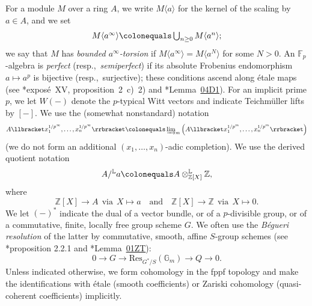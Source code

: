 \documentclass[11pt, reqno]{amsart}
\newcommand{\bF}{\mathbb{F}}
\newcommand{\bL}{\mathbb{L}}
\newcommand{\bZ}{\mathbb{Z}}
\newcommand{\ce}{\colonequals}
\newcommand{\llb}{\llbracket}			%
\providecommand{\p}[1]{\left(#1\right)}
\newcommand{\ra}{\rightarrow}
\newcommand{\rrb}{\rrbracket}			%
\newcommand{\lab}{\label}
\newcommand{\x}{\text}
\providecommand{\qxq}[1]{\quad\text{#1}\quad}
\newcommand{\tst}{\textstyle}
\newcommand{\be}{\begin{equation}}
\newcommand{\ee}{\end{equation}}
\numberwithin{equation}{numberingbase}
\theoremstyle{thms}
\theoremstyle{claims}
\theoremstyle{defs}
\theoremstyle{thms}
\theoremstyle{defs}
\theoremstyle{subsection-tweak}
\theoremstyle{subsection-tweak}
\begin{document}
For a module $M$ over a ring $A$, we write $M\langle a \rangle$ for the kernel of the scaling by $a \in A$, and we set 
\[
\tst M\langle a^\infty \rangle \ce \bigcup_{n \ge 0} M\langle a^n\rangle;
\]
we say that $M$ has \emph{bounded $a^\infty$-torsion} if $M\langle a^\infty\rangle = M\langle a^N\rangle $ for some  $N > 0$. %
An $\bF_p$-algebra is \emph{perfect} (resp.,~\emph{semiperfect}) if its absolute Frobenius endomorphism $a \mapsto a^p$ is bijective (resp.,~surjective); these conditions ascend along \'{e}tale maps (see \cite{SGA5}*{expos\'{e}~XV, proposition~2~c)~2)} and \cite{SP}*{Lemma~\href{https://stacks.math.columbia.edu/tag/04D1}{04D1}}). For an implicit prime $p$, we let $W(-)$ denote the $p$-typical Witt vectors and  indicate Teichm\"{u}ller lifts by $[-]$. We use the (somewhat nonstandard) notation 
\be \lab{nst-terminology}
\tst A\llb x_1^{1/p^\infty},\ldots,x_n^{1/p^\infty}\rrb \ce \varinjlim_m \p{A\llb x_1^{1/p^m},\ldots,x_n^{1/p^m}\rrb}
\ee
(we do not form an additional $(x_1,\ldots,x_n)$-adic completion). We use the derived quotient notation
\[
A/^\bL a \ce A\otimes^\bL_{\mathbb Z[X]} \mathbb Z,
\]
where
\[
\bZ[X] \ra A \ \ \x{via}\ \ X \mapsto a \qxq{and} \bZ[X] \ra \bZ \ \ \x{via}\ \ X \mapsto 0.
\]
We let $(-)^*$ indicate the dual of a vector bundle, or of a $p$-divisible group, or of a commutative, finite, locally free group scheme $G$.
  We often use the \emph{B\'{e}gueri resolution} of the latter by commutative, smooth, affine $S$-group schemes (see \cite{Beg80}*{proposition 2.2.1} and \cite{SP}*{Lemma~\href{http://stacks.math.columbia.edu/tag/01ZT}{01ZT}}):
\be \label{Begueri-0}
0\to G\to \mathrm{Res}_{G^\ast/S}( \mathbb G_m)\to Q\to 0.
\ee
Unless indicated otherwise, we form cohomology in the fppf topology and make the identifications with \'{e}tale (smooth coefficients) or Zariski cohomology (quasi-coherent coefficients) implicitly. 
\end{document}
